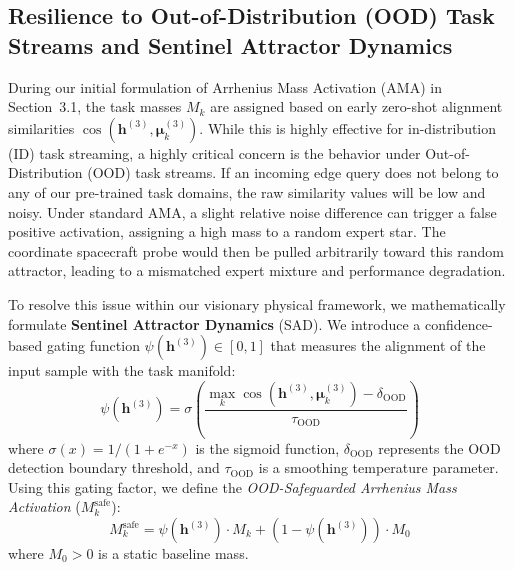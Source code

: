 \subsection{Resilience to Out-of-Distribution (OOD) Task Streams and Sentinel Attractor Dynamics}
\label{sec:appendix_ood_resilience}
During our initial formulation of Arrhenius Mass Activation (AMA) in Section~3.1, the task masses $M_k$ are assigned based on early zero-shot alignment similarities $\cos(\mathbf{h}^{(3)}, \boldsymbol{\mu}_k^{(3)})$. While this is highly effective for in-distribution (ID) task streaming, a highly critical concern is the behavior under Out-of-Distribution (OOD) task streams. If an incoming edge query does not belong to any of our pre-trained task domains, the raw similarity values will be low and noisy. Under standard AMA, a slight relative noise difference can trigger a false positive activation, assigning a high mass to a random expert star. The coordinate spacecraft probe would then be pulled arbitrarily toward this random attractor, leading to a mismatched expert mixture and performance degradation.

To resolve this issue within our visionary physical framework, we mathematically formulate \textbf{Sentinel Attractor Dynamics} (SAD). We introduce a confidence-based gating function $\psi(\mathbf{h}^{(3)}) \in [0, 1]$ that measures the alignment of the input sample with the task manifold:
\begin{equation}
    \psi(\mathbf{h}^{(3)}) = \sigma\left( \frac{\max_k \cos(\mathbf{h}^{(3)}, \boldsymbol{\mu}_k^{(3)}) - \delta_{\text{OOD}}}{\tau_{\text{OOD}}} \right)
\end{equation}
where $\sigma(x) = 1 / (1 + e^{-x})$ is the sigmoid function, $\delta_{\text{OOD}}$ represents the OOD detection boundary threshold, and $\tau_{\text{OOD}}$ is a smoothing temperature parameter. Using this gating factor, we define the \textit{OOD-Safeguarded Arrhenius Mass Activation} ($M_k^{\text{safe}}$):
\begin{equation}
    M_k^{\text{safe}} = \psi(\mathbf{h}^{(3)}) \cdot M_k + \left(1 - \psi(\mathbf{h}^{(3)})\right) \cdot M_0
\end{equation}
where $M_0 > 0$ is a static baseline mass.

